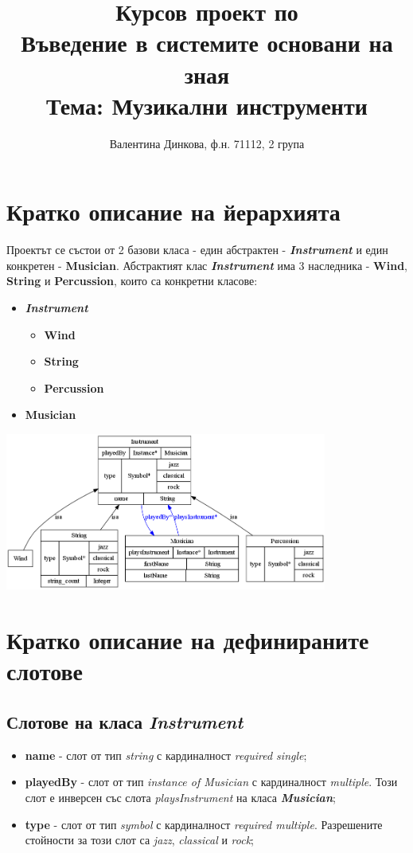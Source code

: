 \documentclass[a4paper,12pt]{article}
\title{Курсов проект по
\\ \vspace{0.5cm} Въведение в системите основани на зная
\\ \vspace{2cm}\Large{Тема: Музикални инструменти}}
\author{Валентина Динкова, ф.н. 71112, 2 група}
\begin{document}
\maketitle

\newpage

\section{Кратко описание на йерархията}
Проектът се състои от 2 базови класа - един абстрактен - \textbf{\textit{Instrument}} и един конкретен -\textbf{ Musician}. Абстрактият клас \textbf{\textit{Instrument}} има 3 наследника - \textbf{Wind}, \textbf{String} и \textbf{Percussion}, които са конкретни класове:
\begin{itemize}
 \item \textbf{\textit{Instrument}}
  \begin{itemize}
   \item \textbf{Wind}
   \item \textbf{String}
   \item \textbf{Percussion}
  \end{itemize}
 \item \textbf{Musician}
\end{itemize}
\includegraphics[width = 400px]{onto_graph.png}

\section{Кратко описание на дефинираните слотове}

\subsection{Слотове на класа \textbf{\textit{Instrument}}}

\begin{itemize}
 \item \textbf{name} - слот от тип \textit{string} с кардиналност \textit{required single};
\item \textbf{playedBy} - слот от тип \textit{instance of Musician} с кардиналност \textit{multiple}. Този слот е инверсен със слота \textit{playsInstrument} на класа \textbf{\textit{Musician}};
\item \textbf{type} - слот от тип \textit{symbol} с кардиналност \textit{required multiple}. Разрешените стойности за този слот са \textit{jazz}, \textit{classical} и \textit{rock};
\end{itemize}
\end{document}
